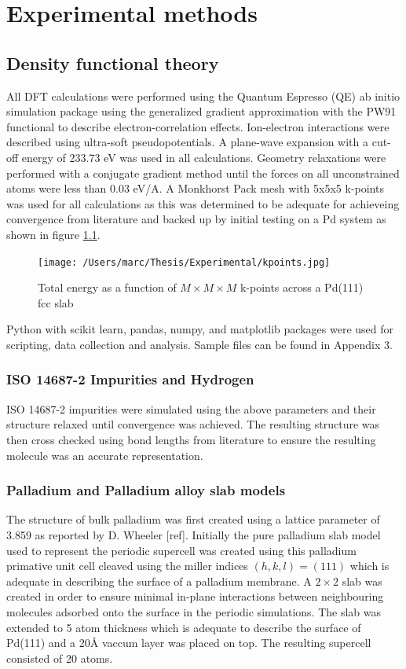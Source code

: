 \chapter{Experimental methods}

\section{Density functional theory} \label{DFTparams}
All DFT calculations were performed using the Quantum Espresso (QE) ab initio simulation package using the generalized gradient approximation with the PW91 functional to describe electron-correlation effects. Ion-electron interactions were described using ultra-soft pseudopotentials. A plane-wave expansion with a cut-off energy of 233.73 eV was used in all calculations. Geometry relaxations were performed with a conjugate gradient method until the forces on all unconstrained atoms were less than 0.03 eV/A. A Monkhorst Pack mesh with 5x5x5 k-points was used for all calculations as this was determined to be adequate for achieveing convergence from literature and backed up by initial testing on a Pd system as shown in figure \ref{kpoints}.

\begin{figure}
  \centering
  \texttt{[image: /Users/marc/Thesis/Experimental/kpoints.jpg]}
  \caption{Total energy as a function of $M\times M\times M$ k-points across a Pd(111) fcc slab}
  \label{kpoints}
\end{figure}

Python with scikit learn, pandas, numpy, and matplotlib packages were used for scripting, data collection and analysis. Sample files can be found in Appendix 3. 

\subsection{ISO 14687-2 Impurities and Hydrogen} \label{gassim}
ISO 14687-2 impurities were simulated using the above parameters and their structure relaxed until convergence was achieved. The resulting structure was then cross checked using bond lengths from literature to ensure the resulting molecule was an accurate representation. 

\subsection{Palladium and Palladium alloy slab models}\label{slabsim}
The structure of bulk palladium was first created using a lattice parameter of 3.859 as reported by D. Wheeler [ref]. Initially the pure palladium slab model used to represent the periodic supercell was created using this palladium primative unit cell cleaved using the miller indices $(h,k,l) = (111)$ which is adequate in describing the surface of a palladium membrane. A $2\times 2$ slab was created in order to ensure minimal in-plane interactions between neighbouring molecules adsorbed onto the surface in the periodic simulations. The slab was extended to 5 atom thickness which is adequate to describe the surface of Pd(111) and a 20\si{\angstrom} vaccum layer was placed on top. The resulting supercell consisted of 20 atoms. 

